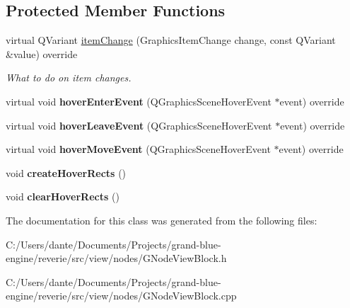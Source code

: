 \subsection*{Protected Member Functions}
\begin{DoxyCompactItemize}
\item 
\mbox{\label{classrev_1_1_view_1_1_node_view_block_a6ee26fb7663eb4a01953381464fcaa40}} 
virtual Q\+Variant \mbox{\hyperlink{classrev_1_1_view_1_1_node_view_block_a6ee26fb7663eb4a01953381464fcaa40}{item\+Change}} (Graphics\+Item\+Change change, const Q\+Variant \&value) override
\begin{DoxyCompactList}\small\item\em What to do on item changes. \end{DoxyCompactList}\item 
\mbox{\label{classrev_1_1_view_1_1_node_view_block_aa44bfcffcd1658717bbbfb5c10959631}} 
virtual void {\bfseries hover\+Enter\+Event} (Q\+Graphics\+Scene\+Hover\+Event $\ast$event) override
\item 
\mbox{\label{classrev_1_1_view_1_1_node_view_block_a689ffdee319e944987c74d23c27359ba}} 
virtual void {\bfseries hover\+Leave\+Event} (Q\+Graphics\+Scene\+Hover\+Event $\ast$event) override
\item 
\mbox{\label{classrev_1_1_view_1_1_node_view_block_a1d77a4ca0ab6a9de5687a386444e189f}} 
virtual void {\bfseries hover\+Move\+Event} (Q\+Graphics\+Scene\+Hover\+Event $\ast$event) override
\item 
\mbox{\label{classrev_1_1_view_1_1_node_view_block_ae9a58a539b8af625984401a14ee485f8}} 
void {\bfseries create\+Hover\+Rects} ()
\item 
\mbox{\label{classrev_1_1_view_1_1_node_view_block_a6c3e9890cc0304403ca92f8027321322}} 
void {\bfseries clear\+Hover\+Rects} ()
\end{DoxyCompactItemize}


The documentation for this class was generated from the following files\+:\begin{DoxyCompactItemize}
\item 
C\+:/\+Users/dante/\+Documents/\+Projects/grand-\/blue-\/engine/reverie/src/view/nodes/G\+Node\+View\+Block.\+h\item 
C\+:/\+Users/dante/\+Documents/\+Projects/grand-\/blue-\/engine/reverie/src/view/nodes/G\+Node\+View\+Block.\+cpp\end{DoxyCompactItemize}
